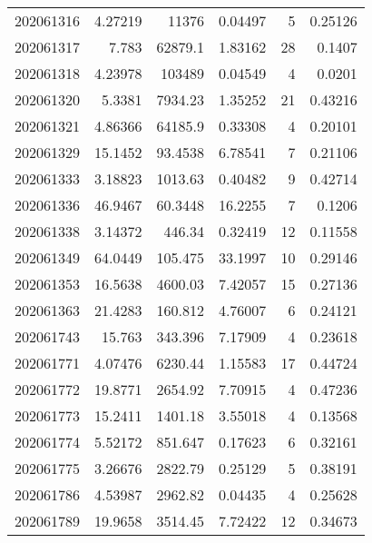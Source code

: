\begin{tabular}{rrrrrr}
 202061316 &          4.27219 &    11376      &            0.04497 &           5 & 0.25126 \\
 202061317 &          7.783   &    62879.1    &            1.83162 &          28 & 0.1407  \\
 202061318 &          4.23978 &   103489      &            0.04549 &           4 & 0.0201  \\
 202061320 &          5.3381  &     7934.23   &            1.35252 &          21 & 0.43216 \\
 202061321 &          4.86366 &    64185.9    &            0.33308 &           4 & 0.20101 \\
 202061329 &         15.1452  &       93.4538 &            6.78541 &           7 & 0.21106 \\
 202061333 &          3.18823 &     1013.63   &            0.40482 &           9 & 0.42714 \\
 202061336 &         46.9467  &       60.3448 &           16.2255  &           7 & 0.1206  \\
 202061338 &          3.14372 &      446.34   &            0.32419 &          12 & 0.11558 \\
 202061349 &         64.0449  &      105.475  &           33.1997  &          10 & 0.29146 \\
 202061353 &         16.5638  &     4600.03   &            7.42057 &          15 & 0.27136 \\
 202061363 &         21.4283  &      160.812  &            4.76007 &           6 & 0.24121 \\
 202061743 &         15.763   &      343.396  &            7.17909 &           4 & 0.23618 \\
 202061771 &          4.07476 &     6230.44   &            1.15583 &          17 & 0.44724 \\
 202061772 &         19.8771  &     2654.92   &            7.70915 &           4 & 0.47236 \\
 202061773 &         15.2411  &     1401.18   &            3.55018 &           4 & 0.13568 \\
 202061774 &          5.52172 &      851.647  &            0.17623 &           6 & 0.32161 \\
 202061775 &          3.26676 &     2822.79   &            0.25129 &           5 & 0.38191 \\
 202061786 &          4.53987 &     2962.82   &            0.04435 &           4 & 0.25628 \\
 202061789 &         19.9658  &     3514.45   &            7.72422 &          12 & 0.34673 \\

\end{tabular}
